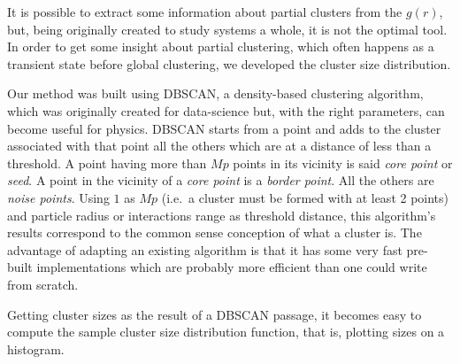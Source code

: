\documentclass[../../master_thesis_np.tex]{subfiles}
\begin{document}
		It is possible to extract some information about partial clusters from the $g(r)$, but, being originally created to study systems a whole, it is not the optimal tool. In order to get some insight about partial clustering, which often happens as a transient state before global clustering, we developed the cluster size distribution. 
		
		Our method was built using DBSCAN, a density-based clustering algorithm, which was originally created for data-science but, with the right parameters, can become useful for physics. DBSCAN starts from a point and adds to the cluster associated with that point all the others which are at a distance of less than a threshold. A point having more than $Mp$ points in its vicinity is said \emph{core point} or \emph{seed}. A point in the vicinity of a \emph{core point} is a \emph{border point}. All the others are \emph{noise points}. Using $1$ as $Mp$ (i.e.\ a cluster must be formed with at least 2 points) and particle radius or interactions range as threshold distance, this algorithm's results correspond to the common sense conception of what a cluster is. The advantage of adapting an existing algorithm is that it has some very fast pre-built implementations which are probably more efficient than one could write from scratch.
		
		Getting cluster sizes as the result of a DBSCAN passage, it becomes easy to compute the sample cluster size distribution function, that is, plotting sizes on a histogram.
\end{document}
